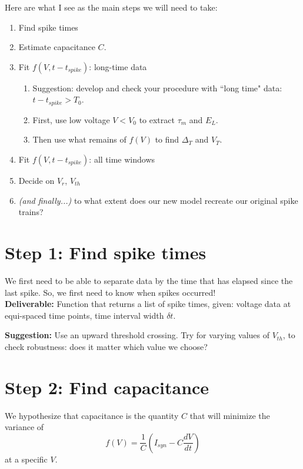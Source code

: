 \documentclass[11pt]{article}
\begin{document}
\noindent
Here are what I see as the main steps we will need to take:
\begin{enumerate}
\item Find spike times
\item Estimate capacitance $C$.
\item Fit $f(V,t-t_{spike})$: long-time data
\begin{enumerate}
\item  Suggestion: develop and check your procedure with ``long time" data: $t-t_{spike} > T_0$. 
\item First, use low voltage $V < V_0$ to extract $\tau_m$ and $E_L$.
\item Then use what remains of $f(V)$ to find $\Delta_T$ and $V_T$.
\end{enumerate}
\item Fit $f(V,t-t_{spike})$: all time windows
\item Decide on $V_r$, $V_{th}$
\item \textit{(and finally...)} to what extent does our new model recreate our original spike trains?
\end{enumerate}
%

\section*{Step 1: Find spike times}
We first need to be able to separate data by the time that has elapsed since the last spike. So, we first need to know when spikes occurred!\\

\noindent
\textbf{Deliverable:} Function that returns a list of spike times, given: voltage data at equi-spaced time points, time interval width $\delta t$.

\noindent
\textbf{Suggestion:} Use an upward threshold crossing. Try for varying values of $V_{th}$, to check robustness: does it matter which value we choose?  

\section*{Step 2: Find capacitance}
We hypothesize that capacitance is the quantity $C$ that will minimize the variance of 
\[  f(V) = \frac{1}{C} \left( I_{syn} - C\frac{dV}{dt} \right)
\]
at a specific $V$.
\end{document}
